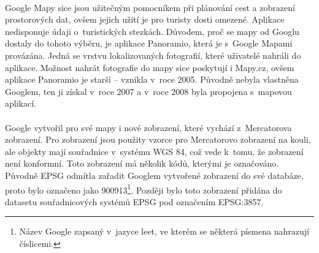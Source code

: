 \documentclass[11pt,a4paper,titlepage,oneside]{book}
\begin{document}


		\paragraph{} Google Mapy sice jsou užitečným pomocníkem při plánování cest a zobrazení prostorových dat, ovšem jejich užití je pro turisty dosti omezené. Aplikace nedisponuje údaji o~turistických stezkách. Důvodem, proč se mapy od Googlu dostaly do tohoto výběru, je aplikace Panoramio, která je s~Google Mapami provázána. Jedná se vrstvu lokalizovaných fotografií, které uživatelé nahráli do aplikace. Možnost nahrát fotografie do mapy sice poskytují i  Mapy.cz, ovšem aplikace Panoramio je starší -- vznikla v~roce 2005. Původně nebyla vlastněna Googlem, ten ji získal v~roce 2007 a v~roce 2008 byla propojena s~mapovou aplikací. 




		\paragraph{}  Google vytvořil pro své mapy i nové zobrazení, které vychází z~Mercatorova zobrazení. Pro zobrazení jsou použity vzorce pro Mercatorovo zobrazení na kouli, ale objekty mají  souřadnice v~systému \ac{WGS 84}, což vede k~tomu, že zobrazení není konformní\cite{google_wiki}\label{google_mercator}. Toto zobrazení má několik kódů, kterými je označováno. Původně \ac{EPSG} odmítla zařadit Googlem vytvořené zobrazení do své databáze, proto bylo označeno jako 900913\footnote{Název Google zapsaný v~jazyce leet, ve kterém se některá písmena nahrazují číslicemi.}. Později bylo toto zobrazení přidána do datasetu souřadnicových systémů \ac{EPSG} pod označením EPSG:3857\cite{sphericalMercator}.
\end{document}
